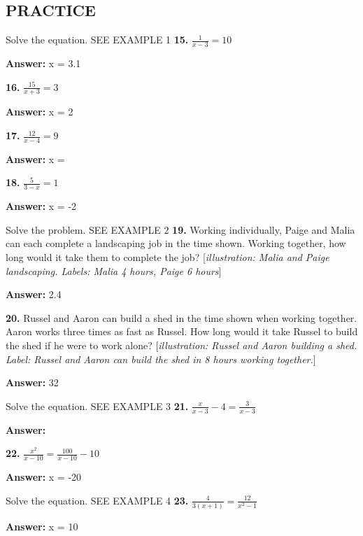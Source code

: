 \documentclass{article}
\newenvironment{practice}[2]{\textbf{#1.}}{\vspace{1em}}
\newcommand{\answer}[1]{\par\textbf{Answer:} #1}
\newcommand{\placeholder}[2]{[\textit{#1: #2}]}
\begin{document}
\subsection*{PRACTICE}
Solve the equation. SEE EXAMPLE 1
\begin{practice}{15}{DOK}
$\frac{1}{x-3} = 10$
\answer{x = 3.1  }
\end{practice}

\begin{practice}{16}{DOK}
$\frac{15}{x+3} = 3$
\answer{x = 2}
\end{practice}

\begin{practice}{17}{DOK}
$\frac{12}{x-4} = 9$
\answer{x = }
\end{practice}

\begin{practice}{18}{DOK}
$\frac{5}{3-x} = 1$
\answer{x = -2}
\end{practice}

Solve the problem. SEE EXAMPLE 2
\begin{practice}{19}{DOK}
Working individually, Paige and Malia can each complete a landscaping job in the time shown. Working together, how long would it take them to complete the job?
\placeholder{illustration}{Malia and Paige landscaping. Labels: Malia 4 hours, Paige 6 hours}
\answer{2.4 }
\end{practice}

\begin{practice}{20}{DOK}
Russel and Aaron can build a shed in the time shown when working together. Aaron works three times as fast as Russel. How long would it take Russel to build the shed if he were to work alone?
\placeholder{illustration}{Russel and Aaron building a shed. Label: Russel and Aaron can build the shed in 8 hours working together.}
\answer{32 }
\end{practice}

Solve the equation. SEE EXAMPLE 3
\begin{practice}{21}{DOK}
$\frac{x}{x-3} - 4 = \frac{3}{x-3}$
\answer{}
\end{practice}

\begin{practice}{22}{DOK}
$\frac{x^2}{x-10} = \frac{100}{x-10} - 10$
\answer{x = -20}
\end{practice}

Solve the equation. SEE EXAMPLE 4
\begin{practice}{23}{DOK}
$\frac{4}{3(x+1)} = \frac{12}{x^2-1}$
\answer{x = 10}
\end{practice}
\end{document}
